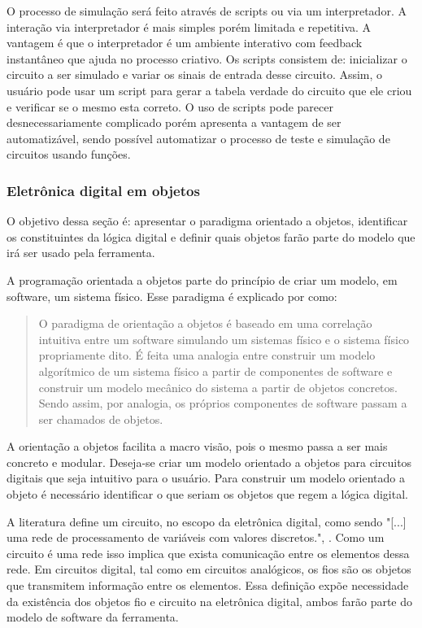 O processo de simulação será feito através de scripts ou via um interpretador.
A interação via interpretador é mais simples porém limitada e repetitiva.
A vantagem é que o interpretador é um ambiente interativo com feedback instantâneo que ajuda no processo criativo.
Os scripts consistem de: inicializar o circuito a ser simulado e variar os sinais de entrada desse circuito.
Assim, o usuário pode usar um script para gerar a tabela verdade do circuito que ele criou e verificar se o mesmo esta correto.
O uso de scripts pode parecer desnecessariamente complicado porém apresenta a vantagem de ser automatizável, sendo possível automatizar o processo de teste e simulação de circuitos usando funções. 

\subsubsection{Eletrônica digital em objetos}

O objetivo dessa seção é: apresentar o paradigma orientado a objetos, identificar os constituintes da lógica digital e definir quais objetos farão parte do modelo que irá ser usado pela ferramenta. 

A programação orientada a objetos parte do princípio de criar um modelo, em software, um sistema físico.
Esse paradigma é explicado por \cite{objects} como:

\begin{quote}
O paradigma de orientação a objetos é baseado em uma correlação intuitiva entre um software simulando um sistemas físico e o sistema físico propriamente dito.
É feita uma analogia entre construir um modelo algorítmico de um sistema físico a partir de componentes de software e construir um modelo mecânico do sistema a partir de objetos concretos.
Sendo assim, por analogia, os próprios componentes de software passam a ser chamados de objetos.
\end{quote}

A orientação a objetos facilita a macro visão, pois o mesmo passa a ser mais concreto e modular.
Deseja-se criar um modelo orientado a objetos para circuitos digitais que seja intuitivo para o usuário.
Para construir um modelo orientado a objeto é necessário identificar o que seriam os objetos que regem a lógica digital.

A literatura define um circuito, no escopo da eletrônica digital, como sendo "[...] uma rede de processamento de variáveis com valores discretos.", \cite{harris}.
Como um circuito é uma rede isso implica que exista comunicação entre os elementos dessa rede.
Em circuitos digital, tal como em circuitos analógicos, os fios são os objetos que transmitem informação entre os elementos.
Essa definição expõe necessidade da existência dos objetos fio e circuito na eletrônica digital, ambos farão parte do modelo de software da ferramenta.

